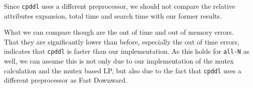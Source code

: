 Since \texttt{cpddl} uses a different preprocessor, we should not compare the relative attributes expansion, total time and search time with our former results.

What we can compare though are the out of time and out of memory errors.
That they are significantly lower than before, especially the out of time errors, indicates that \texttt{cpddl} is faster than our implementation.
As this holds for \texttt{all-N} as well, we can assume this is not only due to our implementation of the mutex calculation and the mutex based LP, but also due to the fact that \texttt{cpddl} uses a different preprocessor as Fast Downward.
